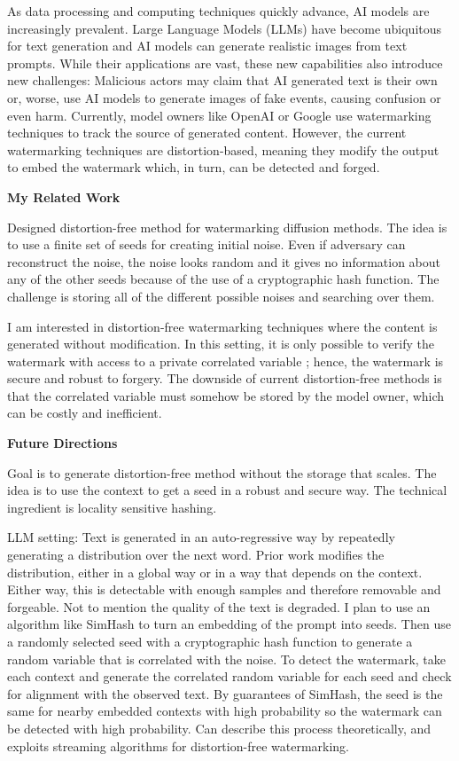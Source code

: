 \documentclass[11pt]{article}
\begin{document}
{As data processing and computing techniques quickly advance, AI models are increasingly prevalent.
Large Language Models (LLMs) have become ubiquitous for text generation and AI models can generate realistic images from text prompts.
While their applications are vast, these new capabilities also introduce new challenges:
Malicious actors may claim that AI generated text is their own or, worse, use AI models to generate images of fake events, causing confusion or even harm.
Currently, model owners like OpenAI or Google use watermarking techniques to track the source of generated content.
However, the current watermarking techniques are distortion-based, meaning they modify the output to embed the watermark which, in turn, can be detected and forged.

{ \large \textbf{My Related Work}}

Designed distortion-free method for watermarking diffusion methods.
The idea is to use a finite set of seeds for creating initial noise.
Even if adversary can reconstruct the noise, the noise looks random and it gives no information about any of the other seeds because of the use of a cryptographic hash function.
The challenge is storing all of the different possible noises and searching over them.

I am interested in distortion-free watermarking techniques where the content is generated without modification.
In this setting, it is only possible to verify the watermark with access to a private correlated variable \cite{arabi2024hidden}; hence, the watermark is secure and robust to forgery.
The downside of current distortion-free methods is that the correlated variable must somehow be stored by the model owner, which can be costly and inefficient.

{ \large \textbf{Future Directions}}

Goal is to generate distortion-free method without the storage that scales.
The idea is to use the context to get a seed in a robust and secure way.
The technical ingredient is locality sensitive hashing.

LLM setting: Text is generated in an auto-regressive way by repeatedly generating a distribution over the next word.
Prior work modifies the distribution, either in a global way or in a way that depends on the context.
Either way, this is detectable with enough samples and therefore removable and forgeable. Not to mention the quality of the text is degraded.
I plan to use an algorithm like SimHash to turn an embedding of the prompt into seeds.
Then use a randomly selected seed with a cryptographic hash function to generate a random variable that is correlated with the noise.
To detect the watermark, take each context and generate the correlated random variable for each seed and check for alignment with the observed text.
By guarantees of SimHash, the seed is the same for nearby embedded contexts with high probability so the watermark can be detected with high probability.
Can describe this process theoretically, and exploits streaming algorithms for distortion-free watermarking.

}
\end{document}

